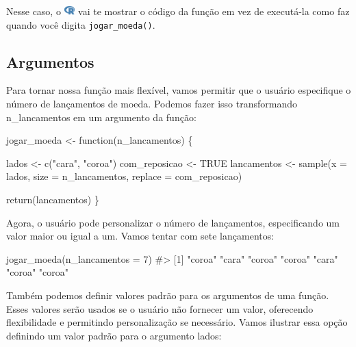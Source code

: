 \documentclass[
  letterpaper,
]{book}
\newenvironment{Shaded}{\begin{snugshade}}{\end{snugshade}}
\newcommand{\AttributeTok}[1]{\textcolor[rgb]{0.40,0.45,0.13}{#1}}
\newcommand{\CommentTok}[1]{\textcolor[rgb]{0.37,0.37,0.37}{#1}}
\newcommand{\ConstantTok}[1]{\textcolor[rgb]{0.56,0.35,0.01}{#1}}
\newcommand{\ControlFlowTok}[1]{\textcolor[rgb]{0.00,0.23,0.31}{#1}}
\newcommand{\DecValTok}[1]{\textcolor[rgb]{0.68,0.00,0.00}{#1}}
\newcommand{\FunctionTok}[1]{\textcolor[rgb]{0.28,0.35,0.67}{#1}}
\newcommand{\NormalTok}[1]{\textcolor[rgb]{0.00,0.23,0.31}{#1}}
\newcommand{\OtherTok}[1]{\textcolor[rgb]{0.00,0.23,0.31}{#1}}
\newcommand{\StringTok}[1]{\textcolor[rgb]{0.13,0.47,0.30}{#1}}
\theoremstyle{definition}
\theoremstyle{plain}
\theoremstyle{remark}
\begin{document}
Nesse caso, o
\includegraphics[width=1.13em,height=1em]{getting_started_with_r_files/figure-pdf/fa-icon-9b00320707d42527dde67262afb33ded.pdf}
vai te mostrar o código da função em vez de executá-la como faz quando
você digita \texttt{jogar\_moeda()}.

\subsection{Argumentos}\label{argumentos}

Para tornar nossa função mais flexível, vamos permitir que o usuário
especifique o número de lançamentos de moeda. Podemos fazer isso
transformando n\_lancamentos em um argumento da função:

\begin{Shaded}
\begin{Highlighting}[]
\NormalTok{jogar\_moeda }\OtherTok{\textless{}{-}} \ControlFlowTok{function}\NormalTok{(n\_lancamentos) \{}
  
\NormalTok{  lados }\OtherTok{\textless{}{-}} \FunctionTok{c}\NormalTok{(}\StringTok{"cara"}\NormalTok{, }\StringTok{"coroa"}\NormalTok{)}
\NormalTok{  com\_reposicao }\OtherTok{\textless{}{-}} \ConstantTok{TRUE}
\NormalTok{  lancamentos }\OtherTok{\textless{}{-}} \FunctionTok{sample}\NormalTok{(}\AttributeTok{x =}\NormalTok{ lados, }
                        \AttributeTok{size =}\NormalTok{ n\_lancamentos, }
                        \AttributeTok{replace =}\NormalTok{ com\_reposicao)}
  
  \FunctionTok{return}\NormalTok{(lancamentos)}
\NormalTok{\}}
\end{Highlighting}
\end{Shaded}

Agora, o usuário pode personalizar o número de lançamentos,
especificando um valor maior ou igual a um. Vamos tentar com sete
lançamentos:

\begin{Shaded}
\begin{Highlighting}[]
\FunctionTok{jogar\_moeda}\NormalTok{(}\AttributeTok{n\_lancamentos =} \DecValTok{7}\NormalTok{)}
\CommentTok{\#\textgreater{} [1] "coroa" "cara"  "coroa" "coroa" "cara"  "coroa" "coroa"}
\end{Highlighting}
\end{Shaded}

Também podemos definir valores padrão para os argumentos de uma função.
Esses valores serão usados se o usuário não fornecer um valor,
oferecendo flexibilidade e permitindo personalização se necessário.
Vamos ilustrar essa opção definindo um valor padrão para o argumento
lados:
\end{document}
